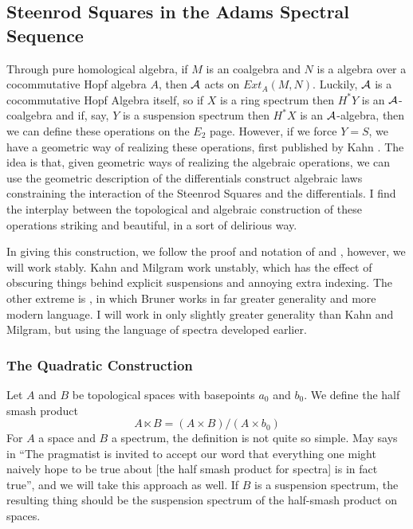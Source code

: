 \subsection{Steenrod Squares in the Adams Spectral Sequence}

Through pure homological algebra, if $M$ is an coalgebra and $N$ is a algebra over a cocommutative Hopf algebra $A$, then $\mathcal{A}$ acts on $Ext_A(M,N)$.  
Luckily, $\mathcal{A}$ is a cocommutative Hopf Algebra itself, so if $X$ is a ring spectrum then $H^*Y$ is an $\mathcal{A}$-coalgebra and if, say, $Y$ is a suspension spectrum then $H^*X$ is an $\mathcal{A}$-algebra, then we can define these operations on the $E_2$ page.  
However, if we force $Y=S$, we have a geometric way of realizing these operations, first published by Kahn \cite{kahnCupi}.  
The idea is that, given geometric ways of realizing the algebraic operations, we can use the geometric description of the differentials construct algebraic laws constraining the interaction of the Steenrod Squares and the differentials.  
I find the interplay between the topological and algebraic construction of these operations striking and beautiful, in a sort of delirious way.  


In giving this construction, we follow the proof and notation of \cite{kahnCupi} and \cite{milgramGroupReps}, however, we will work stably.  
Kahn and Milgram work unstably, which has the effect of obscuring things behind explicit suspensions and annoying extra indexing.  
The other extreme is \cite[Ch~IV.4]{H00RingSpectra}, in which Bruner works in far greater generality and more modern language.
I will work in only slightly greater generality than Kahn and Milgram, but using the language of spectra developed earlier.  

\subsubsection{The Quadratic Construction}

Let $A$ and $B$ be topological spaces with basepoints $a_0$ and $b_0$.  
We define the half smash product
\[A\ltimes B = (A\times B)/(A\times b_0)\]
For $A$ a space and $B$ a spectrum, the definition is not quite so simple.  May says in \cite{H00RingSpectra} ``The pragmatist is invited to accept our word that everything one might naively hope to be true about [the half smash product for spectra] is in fact true'', and we will take this approach as well.  If $B$ is a suspension spectrum, the resulting thing should be the suspension spectrum of the half-smash product on spaces.  

